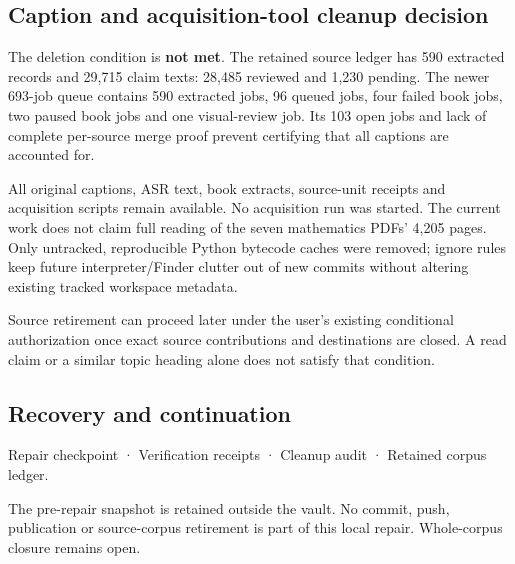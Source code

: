 \subsection{Caption and acquisition-tool cleanup decision}\label{appendix-faa2b5a8e820-caption-and-acquisition-tool-cleanup-decision}

\hypertarget{appendix-faa2b5a8e820-caption-and-acquisition-tool-cleanup-decision}{}

The deletion condition is \textbf{not met}. The retained source ledger has 590 extracted records and 29,715 claim texts: 28,485 reviewed and 1,230 pending. The newer 693-job queue contains 590 extracted jobs, 96 queued jobs, four failed book jobs, two paused book jobs and one visual-review job. Its 103 open jobs and lack of complete per-source merge proof prevent certifying that all captions are accounted for.

All original captions, ASR text, book extracts, source-unit receipts and acquisition scripts remain available. No acquisition run was started. The current work does not claim full reading of the seven mathematics PDFs' 4,205 pages. Only untracked, reproducible Python bytecode caches were removed; ignore rules keep future interpreter/Finder clutter out of new commits without altering existing tracked workspace metadata.

Source retirement can proceed later under the user's existing conditional authorization once exact source contributions and destinations are closed. A read claim or a similar topic heading alone does not satisfy that condition.

\subsection{Recovery and continuation}\label{appendix-faa2b5a8e820-recovery-and-continuation}

\hypertarget{appendix-faa2b5a8e820-recovery-and-continuation}{}

{Repair checkpoint} · {Verification receipts} · {Cleanup audit} · {Retained corpus ledger}.

The pre-repair snapshot is retained outside the vault. No commit, push, publication or source-corpus retirement is part of this local repair. Whole-corpus closure remains open.
